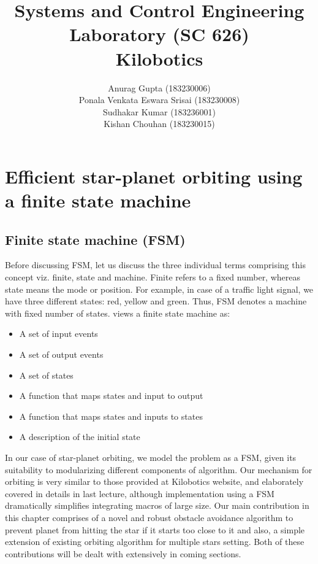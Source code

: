 \documentclass{report}[12pt]
\author{Anurag Gupta (183230006) \\ Ponala Venkata Eswara Srisai
(183230008)\\ Sudhakar Kumar (183236001)\\ Kishan Chouhan (183230015)}
\title{Systems and Control Engineering Laboratory (SC 626) \\ Kilobotics}
\begin{document}
\maketitle
\tableofcontents
\listoffigures
\thispagestyle{empty}
\mbox{}
%

\chapter{Efficient star-planet orbiting using a finite state machine}
\section{Finite state machine (FSM)}
Before discussing FSM, let us discuss the three individual terms comprising this concept viz. finite, state and machine. Finite refers to a fixed number, whereas state means the mode or position. For example, in case of a traffic light signal, we have three different states: red, yellow and green. Thus, FSM denotes a machine with fixed number of states. \cite{LL-GM-BS-rderts} views a finite state machine as:
\begin{itemize}
	\item A set of input events
	\item A set of output events
	\item A set of states
	\item A function that maps states and input to output
	\item A function that maps states and inputs to states
	\item A description of the initial state
\end{itemize}
\noindent In our case of star-planet orbiting, we model the problem as a FSM, given its suitability to modularizing different components of algorithm. Our mechanism for orbiting is very similar to those provided at Kilobotics website, and elaborately covered in details in last lecture, although implementation using a FSM dramatically simplifies integrating macros of large size. Our main contribution in this chapter comprises of a novel and robust obstacle avoidance algorithm to prevent planet from hitting the star if it starts too close to it and also, a simple extension of existing orbiting algorithm for multiple stars setting. Both of these contributions will be dealt with extensively in coming sections. 
\end{document}
